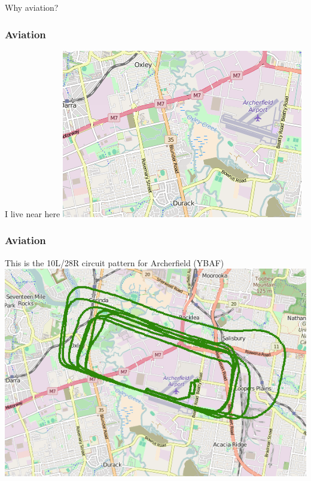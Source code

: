 \begin{frame}
\begin{center}
Why aviation?
\end{center}
\end{frame}

\begin{frame}
\frametitle{Aviation}
\begin{block}{I live near here}
\includegraphics[height=0.5\textheight]{image/archerfield-map.png}
\end{block}
\end{frame}

\begin{frame}
\frametitle{Aviation}
\begin{block}{This is the 10L/28R circuit pattern for Archerfield (YBAF)}
\includegraphics[height=0.5\textheight]{image/archerfield-circuit.png}
\end{block}
\end{frame}

